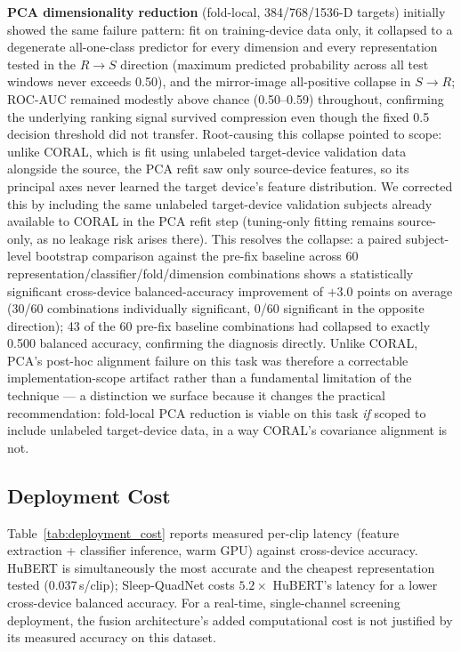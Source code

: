 \documentclass[conference]{IEEEtran}
\begin{document}
\textbf{PCA dimensionality reduction} (fold-local, 384/768/1536-D targets) initially showed the same failure pattern: fit on training-device data only, it collapsed to a degenerate all-one-class predictor for every dimension and every representation tested in the $R\!\to\!S$ direction (maximum predicted probability across all test windows never exceeds 0.50), and the mirror-image all-positive collapse in $S\!\to\!R$; ROC-AUC remained modestly above chance (0.50--0.59) throughout, confirming the underlying ranking signal survived compression even though the fixed 0.5 decision threshold did not transfer. Root-causing this collapse pointed to scope: unlike CORAL, which is fit using unlabeled target-device validation data alongside the source, the PCA refit saw only source-device features, so its principal axes never learned the target device's feature distribution. We corrected this by including the same unlabeled target-device validation subjects already available to CORAL in the PCA refit step (tuning-only fitting remains source-only, as no leakage risk arises there). This resolves the collapse: a paired subject-level bootstrap comparison against the pre-fix baseline across 60 representation/classifier/fold/dimension combinations shows a statistically significant cross-device balanced-accuracy improvement of $+3.0$ points on average (30/60 combinations individually significant, 0/60 significant in the opposite direction); 43 of the 60 pre-fix baseline combinations had collapsed to exactly 0.500 balanced accuracy, confirming the diagnosis directly. Unlike CORAL, PCA's post-hoc alignment failure on this task was therefore a correctable implementation-scope artifact rather than a fundamental limitation of the technique --- a distinction we surface because it changes the practical recommendation: fold-local PCA reduction is viable on this task \emph{if} scoped to include unlabeled target-device data, in a way CORAL's covariance alignment is not.

\subsection{Deployment Cost}

Table~\ref{tab:deployment_cost} reports measured per-clip latency (feature extraction + classifier inference, warm GPU) against cross-device accuracy. HuBERT is simultaneously the most accurate and the cheapest representation tested (0.037\,s/clip); Sleep-QuadNet costs $5.2\times$ HuBERT's latency for a lower cross-device balanced accuracy. For a real-time, single-channel screening deployment, the fusion architecture's added computational cost is not justified by its measured accuracy on this dataset.
\end{document}
